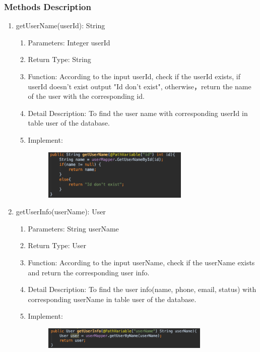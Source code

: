 \documentclass[16pt]{scrreprt}
\begin{document}
\subsubsection{Methods Description}
\begin{enumerate}
	\item getUserName(userId): String
	\begin{enumerate}
		\item Parameters: Integer userId
		\item Return Type: String
		\item Function: According to the input userId, check if the userId exists, if userId doesn't exist output "Id don't exist", otherwise，return the name of the user with the corresponding id.
		\item Detail Description: To find the user name with corresponding userId in table user of the database.
		\item Implement:
		\begin{figure}[H]
	\centering
	\includegraphics[width=0.7\textwidth]{diagrams/getusername1.png}\\
\end{figure}
	\end{enumerate}
	\item getUserInfo(userName): User
	\begin{enumerate}
		\item Parameters: String userName
		\item Return Type: User
		\item Function: According to the input userName, check if the userName exists and return the corresponding user info.
		\item Detail Description: To find the user info(name, phone, email, status) with corresponding userName in table user of the database.
		\item Implement:
		\begin{figure}[H]
	\centering
	\includegraphics[width=0.8\textwidth]{diagrams/getuserinfo.png}\\

\end{figure}
\end{enumerate}
\end{enumerate}
\end{document}
